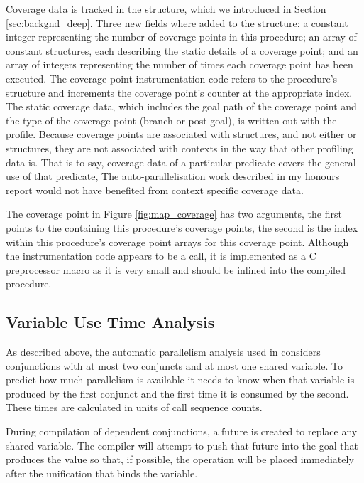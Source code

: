 Coverage data is tracked in the \PS structure,
which we introduced in Section \ref{sec:backgnd_deep}.
Three new fields where added to the \PS structure:
a constant integer representing the number of coverage points in this
procedure;
an array of constant structures,
each describing the static details of a coverage point;
and an array of integers representing the number of times each coverage
point has been executed.
The coverage point instrumentation code refers to the procedure's \PS
structure and increments the coverage point's counter at the appropriate index.
The static coverage data,
which includes the goal path of the coverage point and the type of the
coverage point (branch or post-goal),
is written out with the profile.
Because coverage points are associated with \PS structures,
and not either \PD or \CSD structures,
they are not associated with contexts in the way that other profiling
data is.
That is to say,
coverage data of a particular predicate covers the general use of that
predicate,
The auto-parallelisation work described in my honours report
\citep{bone:2008:hons}
would not have benefited from context specific coverage data.

The coverage point in Figure \ref{fig:map_coverage}
has two arguments,
the first points to the \PS containing this procedure's coverage points,
the second is the index within this procedure's coverage point arrays
for this coverage point.
Although the instrumentation code appears to be a call,
it is implemented as a C preprocessor macro as it is very small and should
be inlined into the compiled procedure.


\subsection{Variable Use Time Analysis}
\label{sec:backgnd_var_use_analysis}

As described above,
the automatic parallelism analysis used in \citet{bone:2008:hons} considers
conjunctions with at most two conjuncts and at most one shared variable.
To predict how much parallelism is available it needs to know
when that variable is produced by the first conjunct
and the first time it is consumed by the second.
These times are calculated in units of call sequence counts.

During compilation of dependent conjunctions,
a future is created to replace any shared variable.
The compiler will attempt to push that future into the goal that
produces the value so that,
if possible,
the \signal operation will be placed immediately after the unification
that binds the variable.

